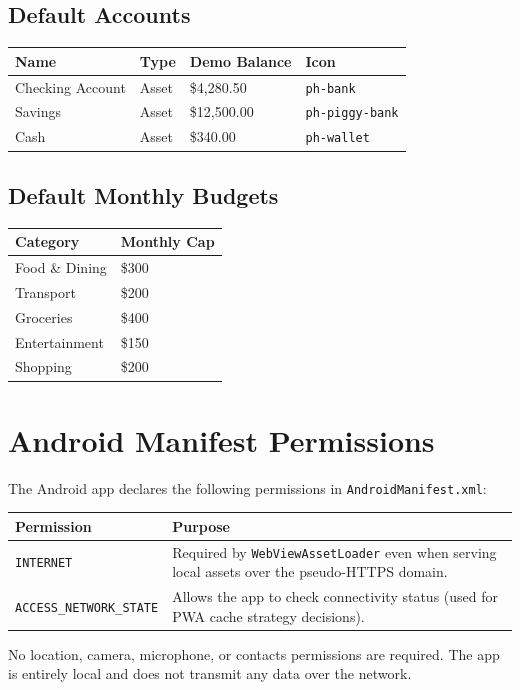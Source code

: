 \documentclass[12pt, a4paper]{article}
\begin{document}
\subsection{Default Accounts}

\begin{longtable}{L{4cm} C{2.5cm} C{3cm} L{4cm}}
  \toprule
  \textbf{Name} & \textbf{Type} & \textbf{Demo Balance} & \textbf{Icon} \\
  \midrule
  \endhead
  Checking Account & Asset & \$4,280.50 & \texttt{ph-bank} \\
  Savings          & Asset & \$12,500.00 & \texttt{ph-piggy-bank} \\
  Cash             & Asset & \$340.00 & \texttt{ph-wallet} \\
  \bottomrule
\end{longtable}

\subsection{Default Monthly Budgets}

\begin{longtable}{L{5cm} C{5cm}}
  \toprule
  \textbf{Category} & \textbf{Monthly Cap} \\
  \midrule
  \endhead
  Food \& Dining   & \$300 \\
  Transport        & \$200 \\
  Groceries        & \$400 \\
  Entertainment    & \$150 \\
  Shopping         & \$200 \\
  \bottomrule
\end{longtable}

\section{Android Manifest Permissions}

The Android app declares the following permissions in \texttt{AndroidManifest.xml}:

\begin{longtable}{L{5.5cm} L{9cm}}
  \toprule
  \textbf{Permission} & \textbf{Purpose} \\
  \midrule
  \endhead
  \texttt{INTERNET} & Required by \texttt{WebViewAssetLoader} even when serving local assets over the pseudo-HTTPS domain. \\[4pt]
  \texttt{ACCESS\_NETWORK\_STATE} & Allows the app to check connectivity status (used for PWA cache strategy decisions). \\
  \bottomrule
\end{longtable}

\begin{notebox}
  No location, camera, microphone, or contacts permissions are required. The app is entirely local and does not transmit any data over the network.
\end{notebox}
\end{document}
